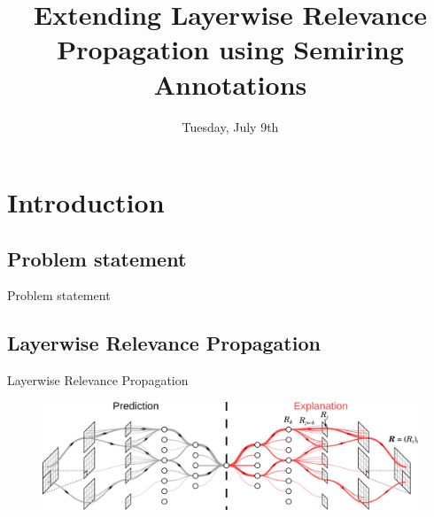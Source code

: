 \documentclass[aspectratio=169]{beamer}
\title{\textbf{Extending Layerwise Relevance Propagation using Semiring Annotations}}
\author{%
  \texorpdfstring{%
    \begin{columns}
      \column{.5\linewidth}
      \centering
      \textbf{Antoine Groudiev} \\ L3, ENS Ulm
      \column{.5\linewidth}
      \centering
      \textbf{Silviu Maniu} -- Supervisor \\ SLIDE Team, LIG
    \end{columns}
 }
 {Antoine Groudiev, Silviu Maniu}
}
\date{Tuesday, July 9th}
\theoremstyle{definition}
\begin{document}
\frame{\titlepage}


\section{Introduction}
\subsection{Problem statement}
\begin{frame}{Problem statement}
    \begin{figure}
        \centering
    \end{figure}
\end{frame}

\subsection{Layerwise Relevance Propagation}
\begin{frame}{Layerwise Relevance Propagation \cite{montavon-lrp}}
    \begin{figure}[H]
        \includegraphics[width=\textwidth]{LRP.png}
    \end{figure}
\end{frame}
\end{document}
